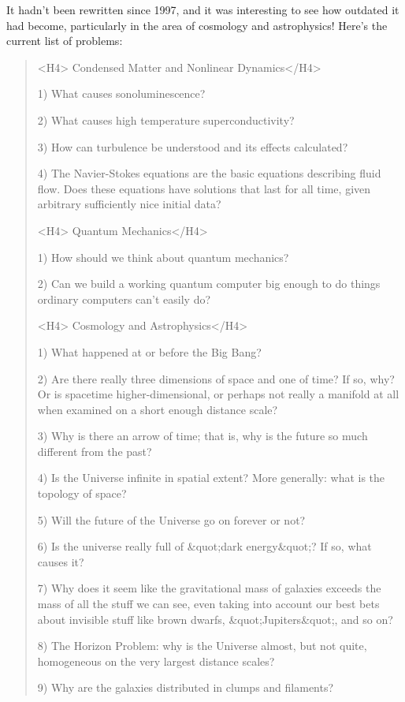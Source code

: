 It hadn't been rewritten since 1997, and it was interesting to see
how outdated it had become, particularly in the area of cosmology
and astrophysics!  Here's the current list of problems:

\begin{quote}
<H4> Condensed Matter and Nonlinear Dynamics</H4>

 1) What causes sonoluminescence?

 2) What causes high temperature superconductivity?
  
 3) How can turbulence be understood and its effects calculated?

 4) The Navier-Stokes equations are the basic equations describing 
    fluid flow.  Does these equations have solutions that last for 
    all time, given arbitrary sufficiently nice initial data?

<H4> Quantum Mechanics</H4>

 1) How should we think about quantum mechanics?

 2) Can we build a working quantum computer big enough to do things
    ordinary computers can't easily do?

<H4> Cosmology and Astrophysics</H4>

 1) What happened at or before the Big Bang?

 2) Are there really three dimensions of space and one of time?
    If so, why?  Or is spacetime higher-dimensional, or perhaps 
    not really a manifold at all when examined on a short enough 
    distance scale?

 3) Why is there an arrow of time; that is, why is the future so 
    much different from the past?

 4) Is the Universe infinite in spatial extent?  More generally:
    what is the topology of space?

 5) Will the future of the Universe go on forever or not?

 6) Is the universe really full of &quot;dark energy&quot;?  If so, what 
    causes it?

 7) Why does it seem like the gravitational mass of galaxies exceeds
    the mass of all the stuff we can see, even taking into account 
    our best bets about invisible stuff like brown dwarfs, &quot;Jupiters&quot;, 
    and so on?

 8) The Horizon Problem: why is the Universe almost, but not quite,
    homogeneous on the very largest distance scales? 

 9) Why are the galaxies distributed in clumps and filaments?


\end{quote}
